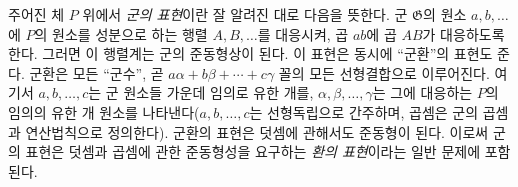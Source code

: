 \documentclass[11pt]{article}
\begin{document}
주어진 체 $P$ 위에서 \emph{군의 표현}이란 잘 알려진 대로 다음을 뜻한다. 군 $\mathfrak{G}$의 원소 $a,b,\ldots$에 $P$의 원소를 성분으로 하는 행렬 $A,B,\ldots$를 대응시켜, 곱 $ab$에 곱 $AB$가 대응하도록 한다. 그러면 이 행렬계는 군의 준동형상이 된다. 이 표현은 동시에 ``군환''의 표현도 준다. 군환은 모든 ``군수'', 곧 $a\alpha+b\beta+\cdots+c\gamma$ 꼴의 모든 선형결합으로 이루어진다. 여기서 $a,b,\ldots,c$는 군 원소들 가운데 임의로 유한 개를, $\alpha,\beta,\ldots,\gamma$는 그에 대응하는 $P$의 임의의 유한 개 원소를 나타낸다($a,b,\ldots,c$는 선형독립으로 간주하며, 곱셈은 군의 곱셈과 연산법칙으로 정의한다). 군환의 표현은 덧셈에 관해서도 준동형이 된다. 이로써 군의 표현은 덧셈과 곱셈에 관한 준동형성을 요구하는 \emph{환의 표현}이라는 일반 문제에 포함된다.
\end{document}

